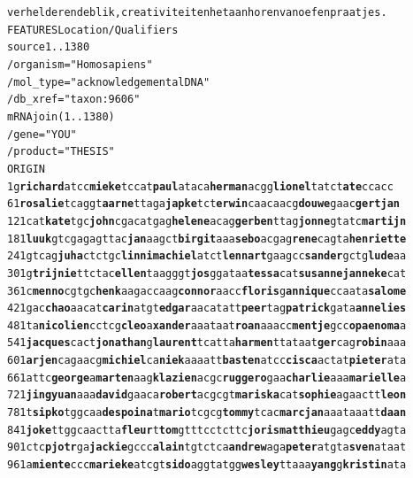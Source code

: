 \begin{appendices}
\begin{alltt}
            verhelderende blik, creativiteit en het aanhoren van oefenpraatjes.
FEATURES             Location/Qualifiers
     source          1..1380
                     /organism="Homo sapiens"
                     /mol_type="acknowledgemental DNA"
                     /db_xref="taxon:9606"
     mRNA            join(1..1380)
                     /gene="YOU"
                     /product="THESIS"
ORIGIN
        1 g\textbf{richard}at cc\textbf{mieke}tcc at\textbf{paul}atac a\textbf{herman}acg g\textbf{lionel}tat ct\textbf{ate}ccacc
       61 \textbf{rosalie}tca ggt\textbf{aarne}tt aga\textbf{japke}tc t\textbf{erwin}caac aacg\textbf{douwe}g aac\textbf{gertjan}
      121 cat\textbf{kate}tgc \textbf{john}cgacat gag\textbf{helene}a cag\textbf{gerben}t tag\textbf{jonne}gt atc\textbf{martijn}
      181 \textbf{luuk}gtcgag agttac\textbf{jan}a agct\textbf{birgit} aaa\textbf{sebo}acg ag\textbf{rene}cagt a\textbf{henriette}
      241 gtcag\textbf{juha}c tctgc\textbf{linni} \textbf{machiel}atc t\textbf{lennart}ga agcc\textbf{sander} gctg\textbf{lude}aa
      301 g\textbf{trijnie}tt ctac\textbf{ellen}t aagggt\textbf{jos}g gataa\textbf{tessa} cat\textbf{susanne} \textbf{janneke}cat
      361 c\textbf{menno}cgtg c\textbf{henk}aagac caag\textbf{connor} aacc\textbf{floris} g\textbf{annique}cc aata\textbf{salome}
      421 gac\textbf{chao}aac at\textbf{carin}atg t\textbf{edgar}aaca tatt\textbf{peer}ta g\textbf{patrick}ga ta\textbf{annelies}
      481 ta\textbf{nicolien} cctcg\textbf{cleo}a \textbf{xander}aaat aat\textbf{roan}aaa cc\textbf{mentje}gc c\textbf{opaenoma}a
      541 \textbf{jacques}cac t\textbf{jonathan}g \textbf{laurent}tca tta\textbf{harmen}t tataat\textbf{ger}c ag\textbf{robin}aaa
      601 \textbf{arjen}cagaa cg\textbf{michiel}c a\textbf{niek}aaaat t\textbf{basten}atc c\textbf{cisca}acta t\textbf{pieter}ata
      661 attc\textbf{george} a\textbf{marten}aag \textbf{klazien}acg c\textbf{ruggero}ga a\textbf{charlie}aa a\textbf{marielle}a
      721 \textbf{jingyuan}aa a\textbf{david}gaac a\textbf{robert}acg cgt\textbf{mariska} cat\textbf{sophie}a gaactt\textbf{leon}
      781 t\textbf{sipko}tggc aa\textbf{despoina} t\textbf{mario}tcgc g\textbf{tommy}tcac \textbf{marcjan}aaa taaatt\textbf{daan}
      841 \textbf{joke}ttggca actta\textbf{fleur} t\textbf{tom}gtttcc tcttc\textbf{joris} \textbf{matthieu}ga gc\textbf{eddy}agta
      901 ctc\textbf{pjotr}ga \textbf{jackie}gccc \textbf{alain}tgtct ca\textbf{andrew}ag a\textbf{peter}atgt a\textbf{sven}ataat
      961 a\textbf{miente}ccc \textbf{marieke}atc gt\textbf{sido}aggt atgg\textbf{wesley} ttaaa\textbf{yang}g \textbf{kristin}ata

\end{alltt}
\end{appendices}
